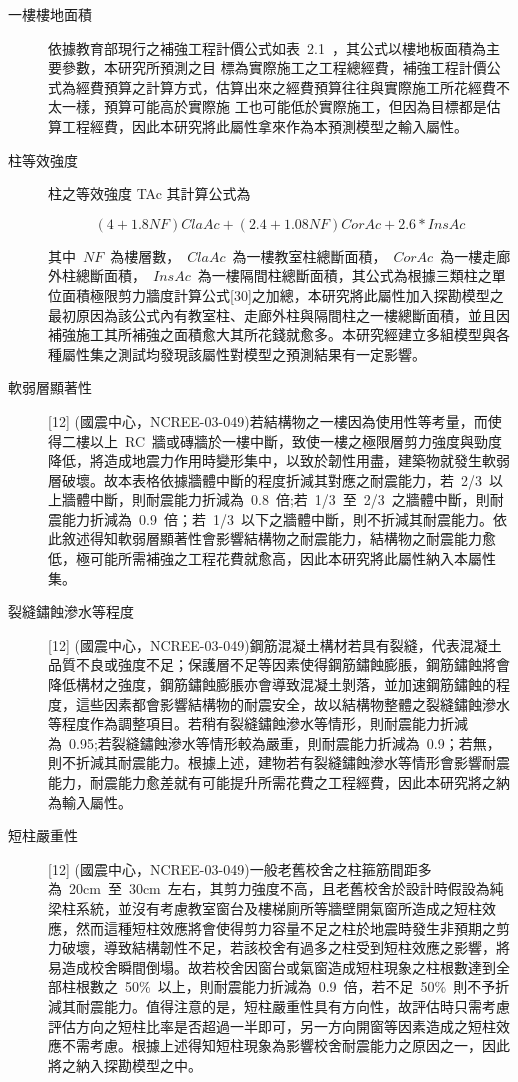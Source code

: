 \begin{description}
  \item[一樓樓地面積]
  依據教育部現行之補強工程計價公式如表~2.1~，其公式以樓地板面積為主要參數，本研究所預測之目 標為實際施工之工程總經費，補強工程計價公式為經費預算之計算方式，估算出來之經費預算往往與實際施工所花經費不太一樣，預算可能高於實際施 工也可能低於實際施工，但因為目標都是估算工程經費，因此本研究將此屬性拿來作為本預測模型之輸入屬性。
  \item[柱等效強度]
  柱之等效強度 TAc 其計算公式為

  \begin{equation}(4+1.8NF)ClaAc+(2.4+1.08NF)CorAc+2.6*InsAc\end{equation} 

  其中~$NF$~為樓層數，~$ClaAc$~為一樓教室柱總斷面積，~$CorAc$~為一樓走廊外柱總斷面積，~$InsAc$~為一樓隔間柱總斷面積，其公式為根據三類柱之單位面積極限剪力牆度計算公式[30]之加總，本研究將此屬性加入探勘模型之最初原因為該公式內有教室柱、走廊外柱與隔間柱之一樓總斷面積，並且因補強施工其所補強之面積愈大其所花錢就愈多。本研究經建立多組模型與各種屬性集之測試均發現該屬性對模型之預測結果有一定影響。
  \item[軟弱層顯著性]
  [12] (國震中心，NCREE-03-049)若結構物之一樓因為使用性等考量，而使得二樓以上~RC~牆或磚牆於一樓中斷，致使一樓之極限層剪力強度與勁度降低，將造成地震力作用時變形集中，以致於韌性用盡，建築物就發生軟弱層破壞。故本表格依據牆體中斷的程度折減其對應之耐震能力，若~2/3~以上牆體中斷，則耐震能力折減為~0.8~倍;若~1/3~至~2/3~之牆體中斷，則耐震能力折減為~0.9~倍；若~1/3~以下之牆體中斷，則不折減其耐震能力。依此敘述得知軟弱層顯著性會影響結構物之耐震能力，結構物之耐震能力愈低，極可能所需補強之工程花費就愈高，因此本研究將此屬性納入本屬性集。
  \item[裂縫鏽蝕滲水等程度]
  [12] (國震中心，NCREE-03-049)鋼筋混凝土構材若具有裂縫，代表混凝土品質不良或強度不足；保護層不足等因素使得鋼筋鏽蝕膨脹，鋼筋鏽蝕將會降低構材之強度，鋼筋鏽蝕膨脹亦會導致混凝土剝落，並加速鋼筋鏽蝕的程度，這些因素都會影響結構物的耐震安全，故以結構物整體之裂縫鏽蝕滲水等程度作為調整項目。若稍有裂縫鏽蝕滲水等情形，則耐震能力折減為~0.95;若裂縫鏽蝕滲水等情形較為嚴重，則耐震能力折減為~0.9；若無，則不折減其耐震能力。根據上述，建物若有裂縫鏽蝕滲水等情形會影響耐震能力，耐震能力愈差就有可能提升所需花費之工程經費，因此本研究將之納為輸入屬性。
  \item[短柱嚴重性]
  [12] (國震中心，NCREE-03-049)一般老舊校舍之柱箍筋間距多為~20cm~至~30cm~左右，其剪力強度不高，且老舊校舍於設計時假設為純梁柱系統，並沒有考慮教室窗台及樓梯廁所等牆壁開氣窗所造成之短柱效應，然而這種短柱效應將會使得剪力容量不足之柱於地震時發生非預期之剪力破壞，導致結構韌性不足，若該校舍有過多之柱受到短柱效應之影響，將易造成校舍瞬間倒塌。故若校舍因窗台或氣窗造成短柱現象之柱根數達到全部柱根數之~50\%~以上，則耐震能力折減為~0.9~倍，若不足~50\%~則不予折減其耐震能力。值得注意的是，短柱嚴重性具有方向性，故評估時只需考慮評估方向之短柱比率是否超過一半即可，另一方向開窗等因素造成之短柱效應不需考慮。根據上述得知短柱現象為影響校舍耐震能力之原因之一，因此將之納入探勘模型之中。

\end{description}
